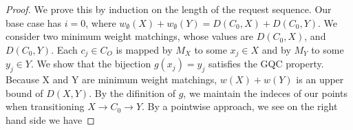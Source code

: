 \begin{proof}
    We prove this by induction on the length of the request sequence. Our base case has $i = 0$, where $w_{\emptyset}(X) + w_{\emptyset}(Y) = D(C_0, X) + D(C_0, Y)$. We consider two minimum weight matchings, whose values are $D(C_0, X)$, and $D(C_0, Y)$. Each $c_j \in C_O$ is mapped by $M_X$ to some $x_j \in X$ and by $M_Y$ to some $y_j \in Y$. We show that the bijection $g(x_j) = y_j$ satisfies the GQC property. Because X and Y are minimum weight matchings, $w(X) + w(Y)$ is an upper bound of $D(X, Y)$. By the difinition of $g$, we maintain the indeces of our points when transitioning $X \rightarrow C_0 \rightarrow Y$. By a pointwise approach, we see on the right hand side we have 
\end{proof}


